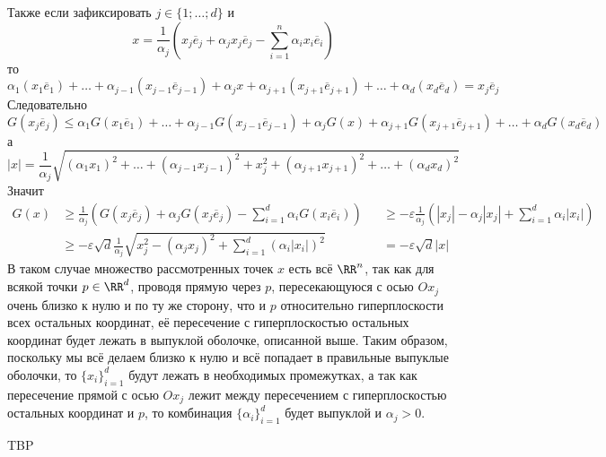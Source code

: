 \documentclass[12pt,a4paper]{article}
\begin{document}
\begin{enumproblem}
        Также если зафиксировать $j \in \{1; \dots; d\}$ и
        \[x = \frac{1}{\alpha_j} \left(x_j \overline{e}_j + \alpha_j x_j \overline{e}_j - \sum_{i=1}^n \alpha_i x_i \overline{e}_i \right)\]
        то
        \[\alpha_1 (x_1 \overline{e}_1) + \dots + \alpha_{j-1} (x_{j-1} \overline{e}_{j-1}) + \alpha_j x + \alpha_{j+1} (x_{j+1} \overline{e}_{j+1}) + \dots + \alpha_d (x_d \overline{e}_d) = x_j \overline{e}_j\]
        Следовательно
        \[G(x_j \overline{e}_j) \leqslant \alpha_1 G(x_1 \overline{e}_1) + \dots + \alpha_{j-1} G(x_{j-1} \overline{e}_{j-1}) + \alpha_j G(x) + \alpha_{j+1} G(x_{j+1} \overline{e}_{j+1}) + \dots + \alpha_d G(x_d \overline{e}_d)\]
        а
        \[|x| = \frac{1}{\alpha_j} \sqrt{(\alpha_1 x_1)^2 + \dots + (\alpha_{j-1} x_{j-1})^2 + x_j^2 + (\alpha_{j+1} x_{j+1})^2 + \dots + (\alpha_d x_d)^2}\]
        Значит
        \begin{align*}
            G(x)
            &\geqslant \frac{1}{\alpha_j} \left(G(x_j \overline{e}_j) + \alpha_j G(x_j \overline{e}_j) - \sum_{i=1}^d \alpha_i G(x_i \overline{e}_i)\right)&
            &\geqslant -\varepsilon \frac{1}{\alpha_j} \left(|x_j| - \alpha_j |x_j| + \sum_{i=1}^d \alpha_i |x_i|\right)\\
            &\geqslant -\varepsilon \sqrt{d} \frac{1}{\alpha_j} \sqrt{x_j^2 - (\alpha_j x_j)^2 + \sum_{i=1}^d (\alpha_i |x_i|)^2}&
            &= -\varepsilon \sqrt{d} |x|
        \end{align*}
        В таком случае множество рассмотренных точек $x$ есть всё $\RR^n$, так как для всякой точки $p \in \RR^d$, проводя прямую через $p$, пересекающуюся с осью $Ox_j$ очень близко к нулю и по ту же сторону, что и $p$ относительно гиперплоскости всех остальных координат, её пересечение с гиперплоскостью остальных координат будет лежать в выпуклой оболочке, описанной выше. Таким образом, поскольку мы всё делаем близко к нулю и всё попадает в правильные выпуклые оболочки, то $\{x_i\}_{i=1}^d$ будут лежать в необходимых промежутках, а так как пересечение прямой с осью $Ox_j$ лежит между пересечением с гиперплоскостью остальных координат и $p$, то комбинация $\{\alpha_i\}_{i=1}^d$ будет выпуклой и $\alpha_j > 0$.
    \end{enumproblem}

    \begin{enumproblem}
        TBP
    \end{enumproblem}
\end{document}
